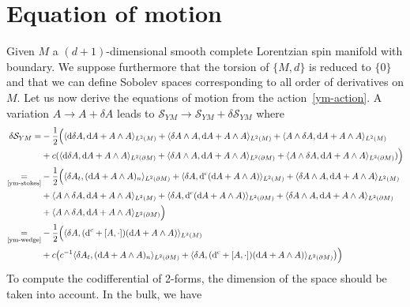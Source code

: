 \section{Equation of motion}
Given $M$ a $(d +1)$-dimensional smooth complete Lorentzian spin manifold with boundary. 
We suppose furthermore that the torsion of $\{M,d\}$ is reduced to $\{0\}$ and that we can define Sobolev spaces corresponding to all order of derivatives on $M$. 
Let us now derive the equations of motion from the action~\cref{ym-action}.
A variation $A \rightarrow A + \delta A$ leads to $\mathcal{S}_{YM} \rightarrow \mathcal{S}_{YM} + \delta\mathcal{S}_{YM}$ where
%
\begin{equation*}
\begin{split}
\delta \mathcal S_{YM} = & -\frac 1 2 \Big(
 \langle \dd \delta A, \dd A +A\wedge A  \rangle_{L^2(M)} +  
 \langle \delta A \wedge A, \dd A + A\wedge A \rangle_{L^2(M)} + 
 \langle A \wedge \delta A , \dd A + A\wedge A \rangle_{L^2(M)}  \\ & + 
 c (\langle \dd \delta A, \dd A +A\wedge A\rangle_{L^2(\partial M)}+
 \langle \delta A \wedge A, \dd A + A\wedge A  \rangle_{L^2(\partial M)} + 
 \langle A \wedge \delta A , \dd A + A\wedge A \rangle_{L^2(\partial M)} 
 )
 \Big) \\
 \underset{\textrm{\cref{ym-stokes}}}{=} & - \frac{1}{2} \Big(
 \langle \delta A_t, (\dd A + A\wedge A)_n \rangle_{L^2(\partial M)} +
 \langle \delta A, \dd^c (\dd A + A\wedge A) \rangle_{L^2(M)} + 
 \langle \delta A \wedge A,  \dd A + A \wedge A \rangle_{L^2(M)} \\ &+
 \langle A \wedge \delta A,  \dd A + A \wedge A \rangle_{L^2(M)}  +
 \langle \delta A, \dd^c (\dd A + A\wedge A) \rangle_{L^2(\partial M)} + 
 \langle \delta A \wedge A, \dd A + A \wedge A \rangle_{L^2(\partial M)} \\&+
 \langle A \wedge \delta A, \dd A + A \wedge A \rangle_{L^2(\partial M)}
 \Big) \\
\underset{\textrm{\cref{ym-wedge}}}{=} & - \frac 1 2 \Big(
\langle \delta A, (\dd^c + [A, \cdot ])(\dd A+ A \wedge A) \rangle_{L^2(M)} \\ &+
c \big( c^{-1}\langle \delta A_t, (\dd A + A\wedge A)_n \rangle_{L^2(\partial M)} +
\langle \delta A, (\dd^c + [A, \cdot ])(\dd A+ A \wedge A) \rangle_{L^2(\partial M)} \big)
\Big)
\end{split}
\end{equation*}
To compute the codifferential of 2-forms, the dimension of the space should be taken into account. In the bulk, we have
